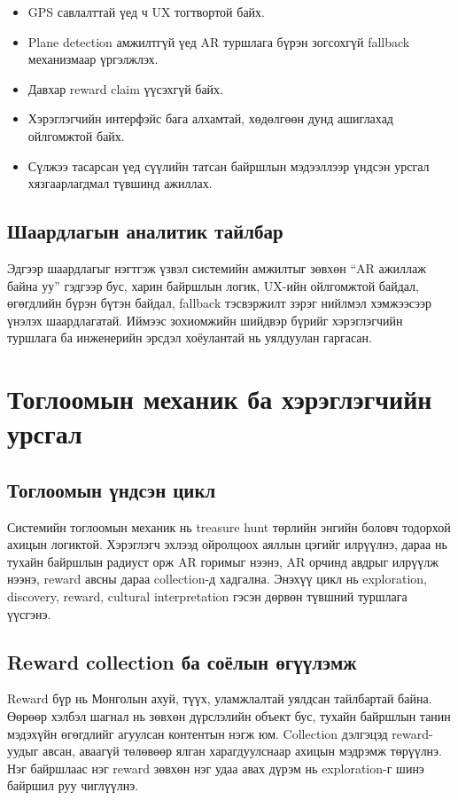 \begin{sloppy}
\begin{itemize}
    \item GPS савлалттай үед ч UX тогтвортой байх.
    \item Plane detection амжилтгүй үед AR туршлага бүрэн зогсохгүй fallback механизмаар үргэлжлэх.
    \item Давхар reward claim үүсэхгүй байх.
    \item Хэрэглэгчийн интерфэйс бага алхамтай, хөдөлгөөн дунд ашиглахад ойлгомжтой байх.
    \item Сүлжээ тасарсан үед сүүлийн татсан байршлын мэдээллээр үндсэн урсгал хязгаарлагдмал түвшинд ажиллах.
\end{itemize}

\subsection{Шаардлагын аналитик тайлбар}

Эдгээр шаардлагыг нэгтгэж үзвэл системийн амжилтыг зөвхөн ``AR ажиллаж байна уу'' гэдгээр бус, харин байршлын логик, UX-ийн ойлгомжтой байдал, өгөгдлийн бүрэн бүтэн байдал, fallback тэсвэржилт зэрэг нийлмэл хэмжээсээр үнэлэх шаардлагатай. Иймээс зохиомжийн шийдвэр бүрийг хэрэглэгчийн туршлага ба инженерийн эрсдэл хоёулантай нь уялдуулан гаргасан.

\section{Тоглоомын механик ба хэрэглэгчийн урсгал}

\subsection{Тоглоомын үндсэн цикл}

Системийн тоглоомын механик нь treasure hunt төрлийн энгийн боловч тодорхой ахицын логиктой. Хэрэглэгч эхлээд ойролцоох аяллын цэгийг илрүүлнэ, дараа нь тухайн байршлын радиуст орж AR горимыг нээнэ, AR орчинд авдрыг илрүүлж нээнэ, reward авсны дараа collection-д хадгална. Энэхүү цикл нь exploration, discovery, reward, cultural interpretation гэсэн дөрвөн түвшний туршлага үүсгэнэ.

\subsection{Reward collection ба соёлын өгүүлэмж}

Reward бүр нь Монголын ахуй, түүх, уламжлалтай уялдсан тайлбартай байна. Өөрөөр хэлбэл шагнал нь зөвхөн дүрслэлийн объект бус, тухайн байршлын танин мэдэхүйн өгөгдлийг агуулсан контентын нэгж юм. Collection дэлгэцэд reward-уудыг авсан, аваагүй төлөвөөр ялган харагдуулснаар ахицын мэдрэмж төрүүлнэ. Нэг байршлаас нэг reward зөвхөн нэг удаа авах дүрэм нь exploration-г шинэ байршил руу чиглүүлнэ.


\end{sloppy}
